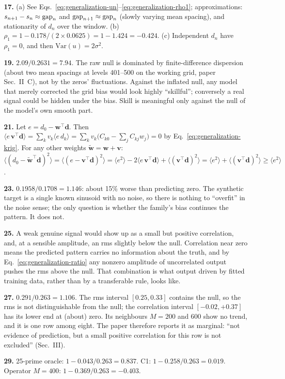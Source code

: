\textbf{17.} (a) See Eqs.~\eqref{eq:generalization-un}--\eqref{eq:generalization-rho1}; approximations: $s_{n+1}-s_n\approx\mathrm{gap}_n$ and $\mathrm{gap}_{n+1}\approx\mathrm{gap}_n$ (slowly varying mean spacing), and stationarity of $d_n$ over the window. (b) $\rho_1=1-0.178/(2\times0.0625)=1-1.424=-0.424$. (c) Independent $d_n$ have $\rho_1=0$, and then $\mathrm{Var}(u)=2\sigma^2$.

\textbf{19.} $2.09/0.2631=7.94$. The raw null is dominated by finite-difference dispersion (about two mean spacings at levels 401--500 on the working grid, paper Sec.~II~C), not by the zeros' fluctuations. Against the inflated null, any model that merely corrected the grid bias would look highly ``skillful''; conversely a real signal could be hidden under the bias. Skill is meaningful only against the null of the model's own smooth part.

\textbf{21.} Let $e=d_0-\bm w^\top\bm d$. Then $\langle e\,\bm v^\top\bm d\rangle=\sum_kv_k\langle e\,d_k\rangle=\sum_kv_k\bigl(C_{k0}-\sum_jC_{kj}w_j\bigr)=0$ by Eq.~\eqref{eq:generalization-krig}. For any other weights $\tilde{\bm w}=\bm w+\bm v$: $\langle(d_0-\tilde{\bm w}^{\top}\bm d)^2\rangle=\langle(e-\bm v^\top\bm d)^2\rangle=\langle e^2\rangle-2\langle e\,\bm v^\top\bm d\rangle+\langle(\bm v^\top\bm d)^2\rangle=\langle e^2\rangle+\langle(\bm v^\top\bm d)^2\rangle\ge\langle e^2\rangle$.

\textbf{23.} $0.1958/0.1708=1.146$: about 15\% worse than predicting zero. The synthetic target is a single known sinusoid with no noise, so there is nothing to ``overfit'' in the noise sense; the only question is whether the family's bias continues the pattern. It does not.

\textbf{25.} A weak genuine signal would show up as a small but positive correlation, and, at a sensible amplitude, an rms slightly below the null. Correlation near zero means the predicted pattern carries no information about the truth, and by Eq.~\eqref{eq:generalization-ratio} any nonzero amplitude of uncorrelated output pushes the rms above the null. That combination is what output driven by fitted training data, rather than by a transferable rule, looks like.

\textbf{27.} $0.291/0.263=1.106$. The rms interval $[0.25,0.33]$ contains the null, so the rms is not distinguishable from the null; the correlation interval $[-0.02,+0.37]$ has its lower end at (about) zero. Its neighbours $M=200$ and $600$ show no trend, and it is one row among eight. The paper therefore reports it as marginal: ``not evidence of prediction, but a small positive correlation for this row is not excluded'' (Sec.~III).

\textbf{29.} 25-prime oracle: $1-0.043/0.263=0.837$. C1: $1-0.258/0.263=0.019$. Operator $M=400$: $1-0.369/0.263=-0.403$.
